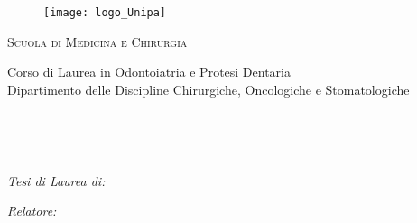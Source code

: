 \documentclass[
12pt, %
english, %
singlespacing, %
headsepline, %
]{MastersDoctoralThesis} %
\author{Calogero \textsc{Carlino}} %
\begin{document}
\frontmatter %

\pagestyle{plain} %


\begin{titlepage}
\begin{center}

\begin{figure}
\texttt{[image: logo\_Unipa]}
\label{fig:logo_Unipa}
\end{figure}


\begin{center}
\textsc{Scuola di Medicina e Chirurgia}
\end{center}

\begin{center}
Corso di Laurea in Odontoiatria e Protesi Dentaria \\
Dipartimento delle Discipline Chirurgiche, Oncologiche e Stomatologiche
\end{center}


\HRule \\[0.4cm] %
{\huge \bfseries \ttitle\par}\vspace{0.4cm} %
\HRule \\[1.5cm] %
 
\begin{minipage}[t]{0.4\textwidth}
\begin{flushleft} \large
\emph{Tesi di Laurea di:}\\
\href{}{\textbf{\authorname}} %
\end{flushleft}
\end{minipage}
\begin{minipage}[t]{0.4\textwidth}
\begin{flushright} \large
\emph{Relatore:} \\
\href{}{\textbf{\supname}} %
\end{flushright}
\end{minipage}\\[2cm]
 

\end{center}
\end{titlepage}
\end{document}
